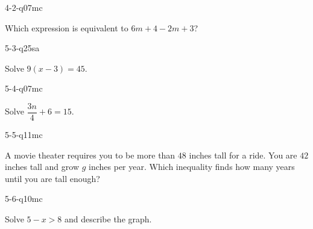\begin{practiceQuestion}{4-2-q07}{mc}
\begin{questionText}
Which expression is equivalent to $6m + 4 - 2m + 3$?
\end{questionText}
\end{practiceQuestion}

\begin{practiceQuestion}{5-3-q25}{sa}
\begin{questionText}
Solve $9(x - 3) = 45$.
\end{questionText}
\end{practiceQuestion}

\begin{practiceQuestion}{5-4-q07}{mc}
\begin{questionText}
Solve $\dfrac{3n}{4} + 6 = 15$.
\end{questionText}
\end{practiceQuestion}

\begin{practiceQuestion}{5-5-q11}{mc}
\begin{questionText}
A movie theater requires you to be more than $48$ inches tall for a ride. You are $42$ inches tall and grow $g$ inches per year. Which inequality finds how many years until you are tall enough?
\end{questionText}
\end{practiceQuestion}

\begin{practiceQuestion}{5-6-q10}{mc}
\begin{questionText}
Solve $5 - x > 8$ and describe the graph.
\end{questionText}
\end{practiceQuestion}

